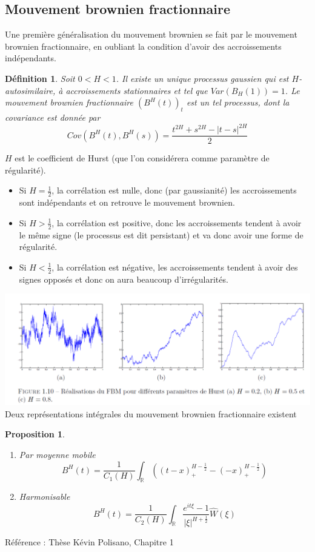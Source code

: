 \documentclass[11pt]{article} %
\newtheorem{definition}{Définition}[section]
\newtheorem{proposition}{Proposition}[section]
\begin{document}
\subsection{Mouvement brownien fractionnaire}
Une première généralisation du mouvement brownien se fait par le mouvement brownien fractionnaire, en oubliant la condition d'avoir des accroissements indépendants.
\begin{definition}
	Soit $0<H<1$. Il existe un unique processus gaussien qui est $H$-autosimilaire, à accroissements stationnaires et tel que $Var(B_H(1)) = 1$. Le mouvement brownien fractionnaire $(B^H(t))_t$ est un tel processus, dont la covariance est donnée par 
	\begin{equation}
		Cov(B^H(t), B^H(s)) = \frac{t^{2H} + s^{2H} - |t-s|^{2H} }{2}
	\end{equation}
\end{definition}
$H$ est le coefficient de Hurst (que l'on considérera comme paramètre de régularité). 
\begin{itemize}
	\item	Si $H=\frac{1}{2}$, la corrélation est nulle, donc (par gaussianité) les accroissements sont indépendants et on retrouve le mouvement brownien.
	\item Si $H>\frac{1}{2}$, la corrélation est positive, donc les accroissements tendent  à avoir le même signe (le processus est dit persistant) et va donc avoir une forme de régularité.
	\item Si $H<\frac{1}{2}$, la corrélation est négative, les accroissements tendent à avoir des signes opposés et donc on aura beaucoup d'irrégularités.
\end{itemize}
\includegraphics[width=1.2\textwidth]{hurst}
Deux représentations intégrales du mouvement brownien fractionnaire existent
\begin{proposition}
	\begin{enumerate}
		\item Par moyenne mobile
			\begin{equation}
				B^H(t) = \frac{1}{C_1(H)} \int_{\mathbb{R}} \left(  (t-x)_+^{H-\frac{1}{2}} - (-x)_+^{H - \frac{1}{2}} \right)
			\end{equation}
		\item Harmonisable
			\begin{equation}
				B^H(t) = \frac{1}{C_2(H)} \int_\mathbb{R} \frac{e^{it\xi} - 1}{|\xi|^{H+\frac{1}{2}}} \hat{W}(\xi)
			\end{equation}
	\end{enumerate}
\end{proposition}
Référence : Thèse Kévin Polisano, Chapitre 1
\end{document}
